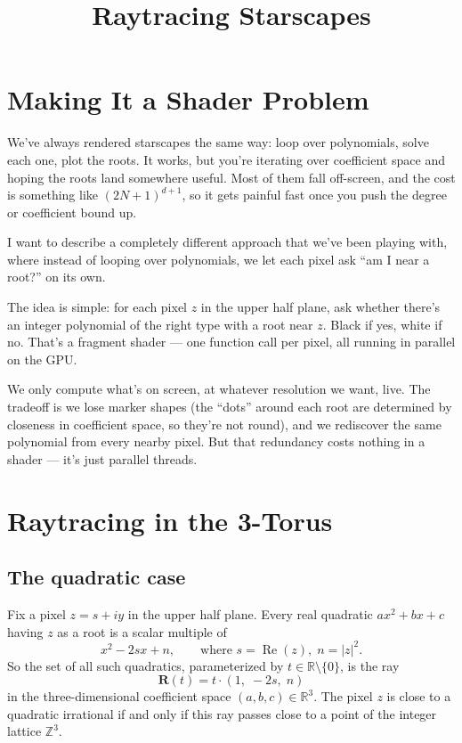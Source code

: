 \documentclass[11pt]{article}
\title{Raytracing Starscapes}
\author{}
\date{}
\newcommand{\R}{\mathbb{R}}
\newcommand{\Z}{\mathbb{Z}}
\newcommand{\re}{\operatorname{Re}}
\begin{document}
\maketitle


\section{Making It a Shader Problem}

We've always rendered starscapes the same way: loop over polynomials, solve each one, plot the roots.
It works, but you're iterating over coefficient space and hoping the roots land somewhere useful.
Most of them fall off-screen, and the cost is something like $(2N+1)^{d+1}$, so it gets painful fast once you push the degree or coefficient bound up.

I want to describe a completely different approach that we've been playing with, where instead of looping over polynomials, we let each pixel ask ``am I near a root?'' on its own.


The idea is simple: for each pixel $z$ in the upper half plane, ask whether there's an integer polynomial of the right type with a root near $z$.
Black if yes, white if no.
That's a fragment shader --- one function call per pixel, all running in parallel on the GPU.

We only compute what's on screen, at whatever resolution we want, live.
The tradeoff is we lose marker shapes (the ``dots'' around each root are determined by closeness in coefficient space, so they're not round), and we rediscover the same polynomial from every nearby pixel.
But that redundancy costs nothing in a shader --- it's just parallel threads.


\section{Raytracing in the 3-Torus}
\label{sec:quadratic}

\subsection{The quadratic case}

Fix a pixel $z = s + iy$ in the upper half plane.
Every real quadratic $ax^2 + bx + c$ having $z$ as a root is a scalar multiple of
\[
    x^2 - 2sx + n, \qquad \text{where } s = \re(z),\; n = |z|^2.
\]
So the set of all such quadratics, parameterized by $t \in \R \setminus \{0\}$, is the ray
\[
    \mathbf{R}(t) = t \cdot (1,\; -2s,\; n)
\]
in the three-dimensional coefficient space $(a, b, c) \in \R^3$.
The pixel $z$ is close to a quadratic irrational if and only if this ray passes close to a point of the integer lattice $\Z^3$.
\end{document}
